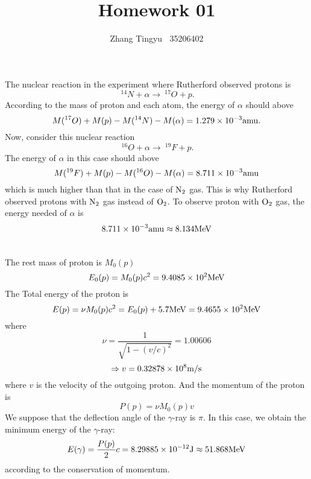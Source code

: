 \documentclass[12pt]{article}
\title{Homework 01}
\author{Zhang Tingyu $\ $ 35206402}
\begin{document}
\maketitle

\section{}

The nuclear reaction in the experiment where Rutherford observed protons is
\begin{equation*}
    \ ^{14}N+\alpha\rightarrow\ ^{17}O+p.
\end{equation*}
According to the mass of proton and each atom, the energy of $\alpha$ should above
\begin{equation*}
    M(^{17}O)+M(p)-M(^{14}N)-M(\alpha)=1.279\times10^{-3}{\rm amu}.
\end{equation*}
Now, consider this nuclear reaction
\begin{equation*}
    \ ^{16}O+\alpha\rightarrow\ ^{19}F+p.
\end{equation*}
The energy of $\alpha$ in this case should above
\begin{equation*}
    M(^{19}F)+M(p)-M(^{16}O)-M(\alpha)=8.711\times10^{-3}{\rm amu}
\end{equation*}
which is much higher than that in the case of $\rm N_2$ gas. This is why Rutherford 
observed protons with $\rm N_2$ gas instead of $\rm O_2$.
To observe proton with $\rm O_2$ gas, the energy needed of $\alpha$ is 
\begin{equation*}
    8.711\times10^{-3}{\rm amu}\approx8.134{\rm MeV}
\end{equation*}

\section{}

The rest mass of proton is $M_0(p)$
\begin{equation*}
    E_0(p)=M_0(p)c^2=9.4085\times10^2{\rm MeV}
\end{equation*}
The Total energy of the proton is 
\begin{equation*}
    E(p)=\nu M_0(p)c^2=E_0(p)+5.7{\rm MeV}=9.4655\times10^2{\rm MeV}
\end{equation*}
where
\begin{equation*}
    \nu=\frac{1}{\sqrt{1-(v/c)^2}}=1.00606
\end{equation*}
\begin{equation*}
    \Rightarrow v=0.32878\times10^8{\rm m/s}
\end{equation*}
where $v$ is the velocity of the outgoing proton. And the momentum of the proton 
is 
\begin{equation*}
    P(p)=\nu M_0(p)v
\end{equation*} 
We suppose that the deflection angle of the $\gamma$-ray is $\pi$. 
In this case, we obtain the minimum energy of the $\gamma$-ray:
\begin{equation*}
    E(\gamma)=\frac{P(p)}{2}c=8.29885\times10^{-12}{\rm J}\approx51.868{\rm MeV}
\end{equation*} 
according to the conservation of momentum.
\end{document}
